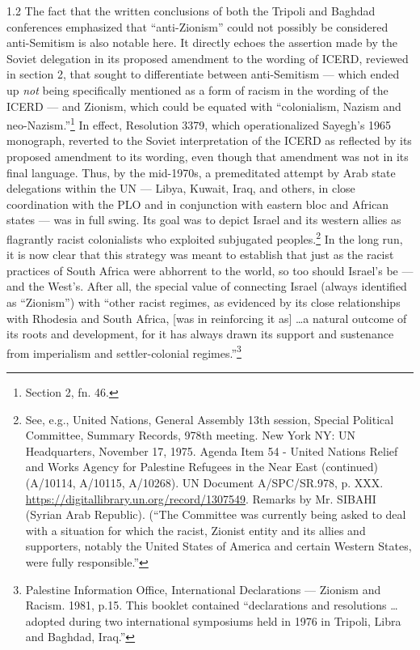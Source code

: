 \documentclass[../unravbook.tex]{subfiles}
\begin{document}
\begin{spacing}{1.2}
\noindent
The fact that the written conclusions of both the Tripoli and Baghdad conferences emphasized that \enquote{anti-Zionism} could not possibly be considered anti-Semitism is also notable here. It directly echoes the assertion made by the Soviet delegation in its proposed amendment to the wording of ICERD, reviewed in section 2, that sought to differentiate between anti-Semitism --- which ended up \textit{not} being specifically mentioned as a form of racism in the wording of the ICERD --- and Zionism, which could be equated with ``colonialism, Nazism and neo-Nazism.''\footnote{Section 2, fn. 46.} In effect, Resolution 3379, which operationalized Sayegh's 1965 monograph, reverted to the Soviet interpretation of the ICERD as reflected by its proposed amendment to its wording, even though that amendment was not in its final language. Thus, by the mid-1970s, a premeditated attempt by Arab state delegations within the UN --- Libya, Kuwait, Iraq, and others, in close coordination with the PLO and in conjunction with eastern bloc and African states --- was in full swing. Its goal was to depict Israel and its western allies as flagrantly racist colonialists who exploited subjugated peoples.\footnote{See, e.g., United Nations, General Assembly 13th session, Special Political Committee, Summary Records, 978th meeting. New York NY: UN Headquarters, November 17, 1975. Agenda Item 54 - United Nations Relief and Works Agency for Palestine Refugees in the Near East (continued) (A/10114, A/10115, A/10268). UN Document A/SPC/SR.978, p. XXX. \url{https://digitallibrary.un.org/record/1307549}. Remarks by Mr. SIBAHI (Syrian Arab Republic). (\enquote{The Committee was currently being asked to deal with a situation for which the racist, Zionist entity and its allies and supporters, notably the United States of America and certain Western States, were fully responsible.}} In the long run, it is now clear that this strategy was meant to establish that just as the racist practices of South Africa were abhorrent to the world, so too should Israel's be --- and the West's. After all, the special value of connecting Israel (always identified as ``Zionism'') with ``other racist regimes, as evidenced by its close relationships with Rhodesia and South Africa, [was in reinforcing it as] \dots a natural outcome of its roots and development, for it has always drawn its support and sustenance from imperialism and settler-colonial regimes.''\footnote{Palestine Information Office, International Declarations --- Zionism and Racism. 1981, p.15. This booklet contained \enquote{declarations and resolutions \dots adopted during two international symposiums held in 1976 in Tripoli, Libra and Baghdad, Iraq.}} 


\end{spacing}
\end{document}
